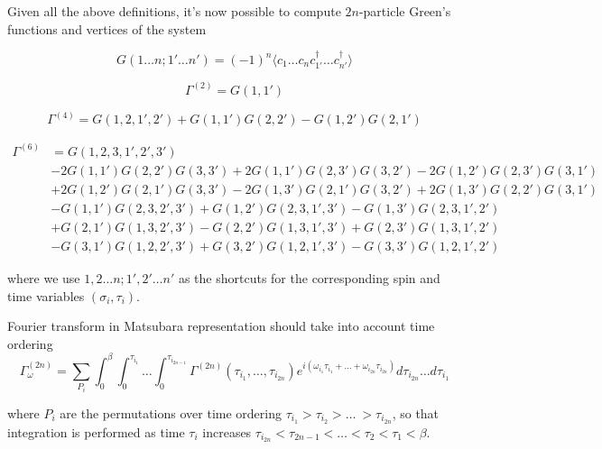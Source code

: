 Given all the above definitions, it's now possible to compute $2n$-particle Green's functions and vertices of the system

\begin{equation} G(1\dots n;1'\dots n') = (-1)^n \langle c_1\dots c_n c_{1'}^\dagger\dots c_{n'}^\dagger\rangle\end{equation}

\begin{equation} \Gamma^{(2)} = G(1, 1') \end{equation}

\begin{equation} \Gamma^{(4)} = G(1,2,1',2')+G(1,1')G(2,2')-G(1,2')G(2,1')\end{equation}

\begin{equation}\begin{aligned}
\Gamma^{(6)} & = G(1, 2, 3, 1', 2', 3') \\
& -2 G(1, 1') G(2, 2') G(3, 3') 
+2 G(1, 1') G(2, 3') G(3, 2')
-2 G(1, 2') G(2, 3') G(3, 1') \\ 
& +2 G(1, 2') G(2, 1') G(3, 3')
-2 G(1, 3') G(2, 1') G(3, 2')
+2 G(1, 3') G(2, 2') G(3, 1') \\
& -G(1, 1') G(2, 3, 2', 3')
+G(1, 2') G(2, 3, 1', 3')
-G(1, 3') G(2, 3, 1', 2') \\
& +G(2, 1') G(1, 3, 2', 3')
-G(2, 2') G(1, 3, 1', 3')
+G(2, 3') G(1, 3, 1', 2') \\
& -G(3, 1') G(1, 2, 2', 3')
+G(3, 2') G(1, 2, 1', 3')
-G(3, 3') G(1, 2, 1', 2')
\end{aligned}\end{equation}

where we use $1,2\dots n;1',2'\dots n'$ as the shortcuts for the corresponding spin and time variables $(\sigma_i,\tau_i)$.

Fourier transform in Matsubara representation should take into account time ordering
\begin{equation}
  \Gamma_\omega^{(2n)} = \sum_{P_i} \int_0^\beta\int_0^{\tau_{i_1}}\dots\int_0^{\tau_{i_{2n-1}}}\Gamma^{(2n)}(\tau_{i_1},\dots,\tau_{i_{2n}})
  e^{i(\omega_{i_1}\tau_{i_1}+\dots+\omega_{i_{2n}}\tau_{i_{2n}})}d\tau_{i_{2n}}\dots d\tau_{i_1}
\end{equation}

where $P_i$ are the permutations over time ordering $\tau_{i_1}>\tau_{i_2}>\dots\ >\tau_{i_{2n}}$,
 so that integration is performed as time $\tau_i$ increases $\tau_{i_{2n}}<\tau_{2n-1}<\dots<\tau_2<\tau_1<\beta$.

